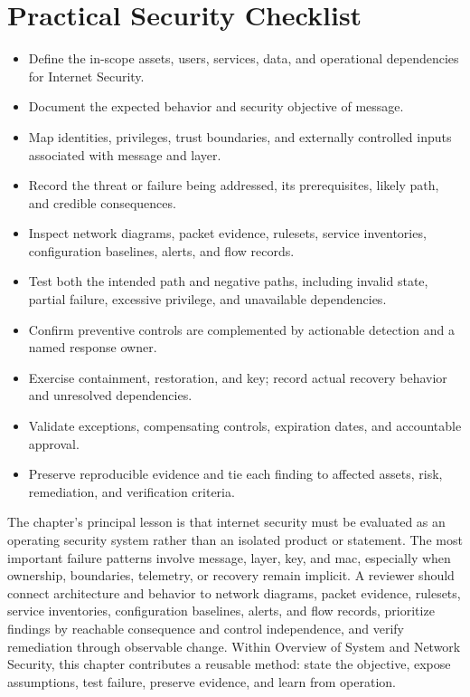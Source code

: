 \documentclass[11pt]{article}
\begin{document}
\section*{Practical Security Checklist}
\begin{itemize}[label=$\square$]
\item Define the in-scope assets, users, services, data, and operational dependencies for Internet Security.
\item Document the expected behavior and security objective of message.
\item Map identities, privileges, trust boundaries, and externally controlled inputs associated with message and layer.
\item Record the threat or failure being addressed, its prerequisites, likely path, and credible consequences.
\item Inspect network diagrams, packet evidence, rulesets, service inventories, configuration baselines, alerts, and flow records.
\item Test both the intended path and negative paths, including invalid state, partial failure, excessive privilege, and unavailable dependencies.
\item Confirm preventive controls are complemented by actionable detection and a named response owner.
\item Exercise containment, restoration, and key; record actual recovery behavior and unresolved dependencies.
\item Validate exceptions, compensating controls, expiration dates, and accountable approval.
\item Preserve reproducible evidence and tie each finding to affected assets, risk, remediation, and verification criteria.
\end{itemize}
\begin{synthesisbox}
The chapter's principal lesson is that internet security must be evaluated as an operating security system rather than an isolated product or statement. The most important failure patterns involve message, layer, key, and mac, especially when ownership, boundaries, telemetry, or recovery remain implicit. A reviewer should connect architecture and behavior to network diagrams, packet evidence, rulesets, service inventories, configuration baselines, alerts, and flow records, prioritize findings by reachable consequence and control independence, and verify remediation through observable change. Within Overview of System and Network Security, this chapter contributes a reusable method: state the objective, expose assumptions, test failure, preserve evidence, and learn from operation.
\end{synthesisbox}
\end{document}
